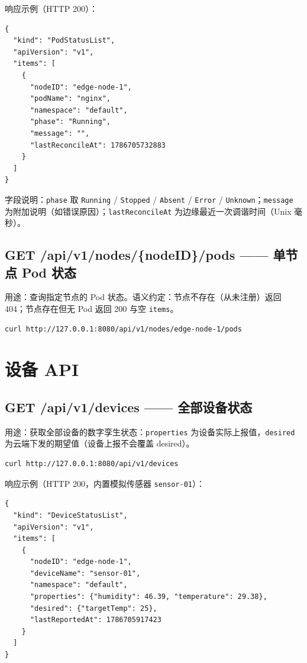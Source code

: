 响应示例（HTTP 200）：

\begin{lstlisting}
{
  "kind": "PodStatusList",
  "apiVersion": "v1",
  "items": [
    {
      "nodeID": "edge-node-1",
      "podName": "nginx",
      "namespace": "default",
      "phase": "Running",
      "message": "",
      "lastReconcileAt": 1786705732883
    }
  ]
}
\end{lstlisting}

字段说明：\texttt{phase} 取 \texttt{Running} / \texttt{Stopped} / \texttt{Absent} / \texttt{Error} / \texttt{Unknown}；\texttt{message} 为附加说明（如错误原因）；\texttt{lastReconcileAt} 为边缘最近一次调谐时间（Unix 毫秒）。

\subsection{GET /api/v1/nodes/\{nodeID\}/pods —— 单节点 Pod 状态}

用途：查询指定节点的 Pod 状态。语义约定：节点不存在（从未注册）返回 404；节点存在但无 Pod 返回 200 与空 \texttt{items}。

\begin{lstlisting}
curl http://127.0.0.1:8080/api/v1/nodes/edge-node-1/pods
\end{lstlisting}

\section{设备 API}

\subsection{GET /api/v1/devices —— 全部设备状态}

用途：获取全部设备的数字孪生状态：\texttt{properties} 为设备实际上报值，\texttt{desired} 为云端下发的期望值（设备上报不会覆盖 desired）。

\begin{lstlisting}
curl http://127.0.0.1:8080/api/v1/devices
\end{lstlisting}

响应示例（HTTP 200，内置模拟传感器 \texttt{sensor-01}）：

\begin{lstlisting}
{
  "kind": "DeviceStatusList",
  "apiVersion": "v1",
  "items": [
    {
      "nodeID": "edge-node-1",
      "deviceName": "sensor-01",
      "namespace": "default",
      "properties": {"humidity": 46.39, "temperature": 29.38},
      "desired": {"targetTemp": 25},
      "lastReportedAt": 1786705917423
    }
  ]
}
\end{lstlisting}

